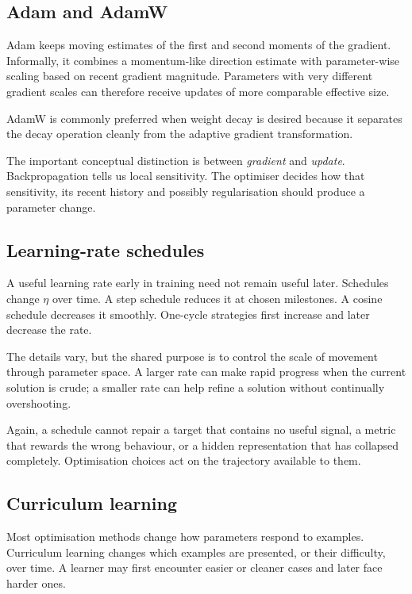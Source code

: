 \subsection{Adam and AdamW}

Adam keeps moving estimates of the first and second moments of the gradient. Informally, it combines a momentum-like direction estimate with parameter-wise scaling based on recent gradient magnitude. Parameters with very different gradient scales can therefore receive updates of more comparable effective size.

AdamW is commonly preferred when weight decay is desired because it separates the decay operation cleanly from the adaptive gradient transformation.

The important conceptual distinction is between \emph{gradient} and \emph{update}. Backpropagation tells us local sensitivity. The optimiser decides how that sensitivity, its recent history and possibly regularisation should produce a parameter change.

\subsection{Learning-rate schedules}

A useful learning rate early in training need not remain useful later. Schedules change \(\eta\) over time. A step schedule reduces it at chosen milestones. A cosine schedule decreases it smoothly. One-cycle strategies first increase and later decrease the rate.

The details vary, but the shared purpose is to control the scale of movement through parameter space. A larger rate can make rapid progress when the current solution is crude; a smaller rate can help refine a solution without continually overshooting.

Again, a schedule cannot repair a target that contains no useful signal, a metric that rewards the wrong behaviour, or a hidden representation that has collapsed completely. Optimisation choices act on the trajectory available to them.

\subsection{Curriculum learning}

Most optimisation methods change how parameters respond to examples. Curriculum learning changes which examples are presented, or their difficulty, over time. A learner may first encounter easier or cleaner cases and later face harder ones.


